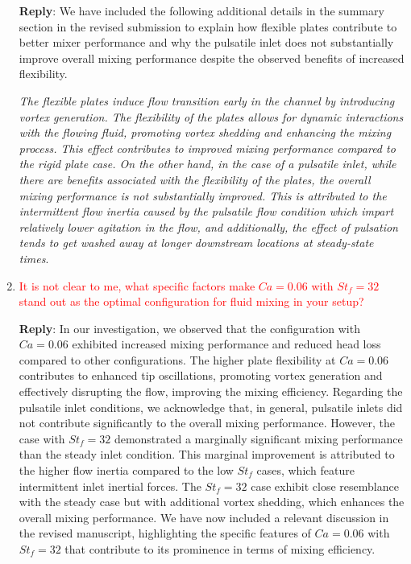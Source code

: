 \documentclass[onecolumn,a4paper,amsmath,amssym,pre]{revtex4}
\begin{document}
\begin{enumerate}
					\textbf{Reply}: We have included the following additional details in the summary section in the revised submission to explain how flexible plates contribute to better mixer performance and why the pulsatile inlet does not substantially improve overall mixing performance despite the observed benefits of increased flexibility.
					
					\textit{The flexible plates induce flow transition early in the channel by introducing vortex generation. The flexibility of the plates allows for dynamic interactions with the flowing fluid, promoting vortex shedding and enhancing the mixing process. This effect contributes to improved mixing performance compared to the rigid plate case.
					On the other hand, in the case of a pulsatile inlet, while there are benefits associated with the flexibility of the plates, the overall mixing performance is not substantially improved. This is attributed to the intermittent flow inertia caused by the pulsatile flow condition which impart relatively lower agitation in the flow, and additionally, the effect of pulsation tends to get washed away at longer downstream locations at steady-state times}.
					
					\item \textcolor{red}{It is not clear to me, what specific factors make $Ca = 0.06$ with $St_f = 32$ stand out as the optimal configuration for fluid mixing in your setup?}
					
					\textbf{Reply}: In our investigation, we observed that the configuration with $Ca=0.06$ exhibited increased mixing performance and reduced head loss compared to other configurations. The higher plate flexibility at $Ca=0.06$ contributes to enhanced tip oscillations, promoting vortex generation and effectively disrupting the flow, improving the mixing efficiency.
					Regarding the pulsatile inlet conditions, we acknowledge that, in general, pulsatile inlets did not contribute significantly to the overall mixing performance. However, the case with $St_f=32$ demonstrated a marginally significant mixing performance than the steady inlet condition. This marginal improvement is attributed to the higher flow inertia compared to the low $St_f$ cases, which feature intermittent inlet inertial forces. The $St_f=32$ case exhibit close resemblance with the steady case but with additional vortex shedding, which enhances the overall mixing performance.			
					We have now included a relevant discussion in the revised manuscript, highlighting the specific features of $Ca=0.06$ with $St_f=32$ that contribute to its prominence in terms of mixing efficiency.
					

\end{enumerate}
\end{document}
